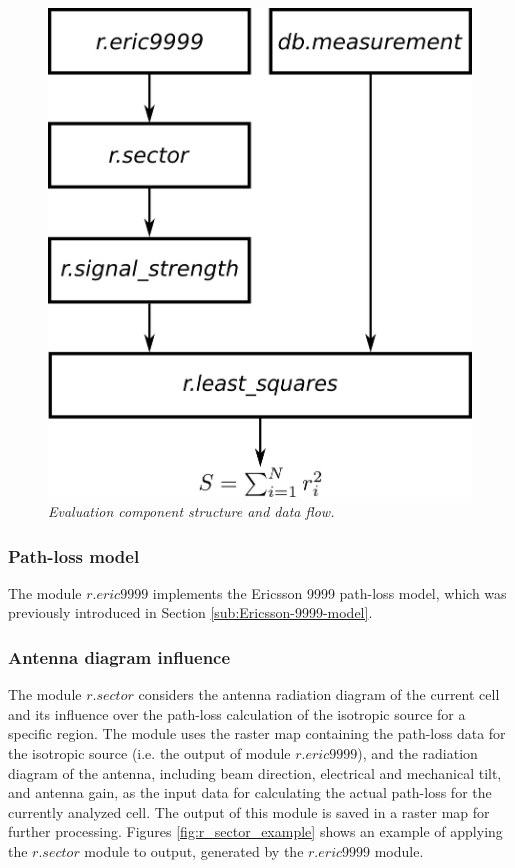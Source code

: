 \begin{figure}
\centering

\includegraphics[width=1\columnwidth]{05-framework_parameter_tuning/img/evaluation_component}

\caption{\textit{Evaluation component structure and data flow.\label{fig:evaluation_component}}}
\end{figure}



\subsubsection{Path-loss model}

The module $r.eric9999$ implements the Ericsson 9999 path-loss model,
which was previously introduced in Section \ref{sub:Ericsson-9999-model}.


\subsubsection{Antenna diagram influence}

The module $r.sector$\emph{ }considers the antenna radiation diagram
of the current cell and its influence over the path-loss calculation
of the isotropic source for a specific region. The module uses the
raster map containing the path-loss data for the isotropic source
(i.e. the output of module \emph{$r.eric9999$}), and the radiation
diagram of the antenna, including beam direction, electrical and mechanical
tilt, and antenna gain, as the input data for calculating the actual
path-loss for the currently analyzed cell. The output of this module
is saved in a raster map for further processing. Figures \ref{fig:r_sector_example}
shows an example of applying the $r.sector$ module to output, generated
by the $r.eric9999$ module.

